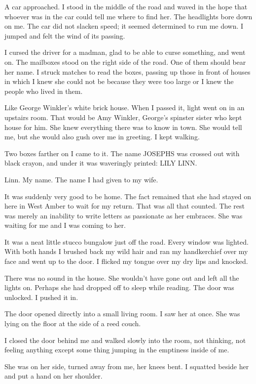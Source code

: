 \documentclass{novel}
\begin{document}
A car approached. I stood in the middle of the road and waved in the hope that whoever was in the car could tell me where to find her. The headlights bore down on me. The car did not slacken speed; it seemed determined to run me down. I jumped and felt the wind of its passing.

I cursed the driver for a madman, glad to be able to curse something, and went on. The mailboxes stood on the right side of the road. One of them should bear her name. I struck matches to read the boxes, passing up those in front of houses in which I knew she could not be because they were too large or I knew the people who lived in them.

Like George Winkler’s white brick house. When I passed it, light went on in an upstairs room. That would be Amy Winkler, George’s spinster sister who kept house for him. She knew everything there was to know in town. She would tell me, but she would also gush over me in greeting. I kept walking.

Two boxes farther on I came to it. The name JOSEPHS was crossed out with black crayon, and under it was waveringly printed: LILY LINN.

Linn. My name. The name I had given to my wife.

It was suddenly very good to be home. The fact remained that she had stayed on here in West Amber to wait for my return. 
That was all that counted. The rest was merely an inability to write letters as passionate as her embraces. She was waiting for me and I was coming to her.

It was a neat little stucco bungalow just off the road. Every window was lighted. With both hands I brushed back my wild hair and ran my handkerchief over my face and went up to the door. I flicked my tongue over my dry lips and knocked.

There was no sound in the house. She wouldn’t have gone out and left all the lights on. Perhaps she had dropped off to sleep while reading. The door was unlocked. I pushed it in.

The door opened directly into a small living room. I saw her at once. She was lying on the floor at the side of a reed couch.

I closed the door behind me and walked slowly into the room, not thinking, not feeling anything except some thing jumping in the emptiness inside of me.

She was on her side, turned away from me, her knees bent. I squatted beside her and put a hand on her shoulder.
\end{document}
